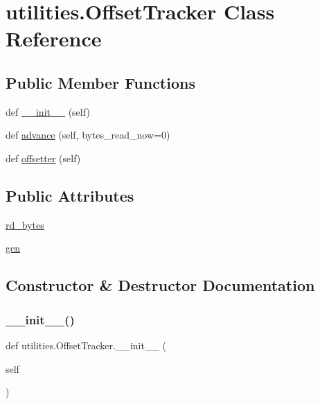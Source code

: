 \hypertarget{classutilities_1_1OffsetTracker}{}\section{utilities.\+Offset\+Tracker Class Reference}
\label{classutilities_1_1OffsetTracker}
\subsection*{Public Member Functions}
\begin{DoxyCompactItemize}
\item 
def \hyperlink{classutilities_1_1OffsetTracker_a75d00b8c481ed3b39c2962b8e6e66b91}{\+\_\+\+\_\+init\+\_\+\+\_\+} (self)
\item 
def \hyperlink{classutilities_1_1OffsetTracker_a058ad5ae0b53bfbfecc4612e094951d5}{advance} (self, bytes\+\_\+read\+\_\+now=0)
\item 
def \hyperlink{classutilities_1_1OffsetTracker_a3ed692ec6058294066507626026b78f1}{offsetter} (self)
\end{DoxyCompactItemize}
\subsection*{Public Attributes}
\begin{DoxyCompactItemize}
\item 
\hyperlink{classutilities_1_1OffsetTracker_ac6ebf15df031eb10591c8e8a8d8e0168}{rd\+\_\+bytes}
\item 
\hyperlink{classutilities_1_1OffsetTracker_aa316b20e9e769ec032e38d902846f279}{gen}
\end{DoxyCompactItemize}


\subsection{Constructor \& Destructor Documentation}
\mbox{\label{classutilities_1_1OffsetTracker_a75d00b8c481ed3b39c2962b8e6e66b91}} 
\subsubsection{\texorpdfstring{\+\_\+\+\_\+init\+\_\+\+\_\+()}{\_\_init\_\_()}}
{\footnotesize\ttfamily def utilities.\+Offset\+Tracker.\+\_\+\+\_\+init\+\_\+\+\_\+ (\begin{DoxyParamCaption}\item[{}]{self }\end{DoxyParamCaption})}



